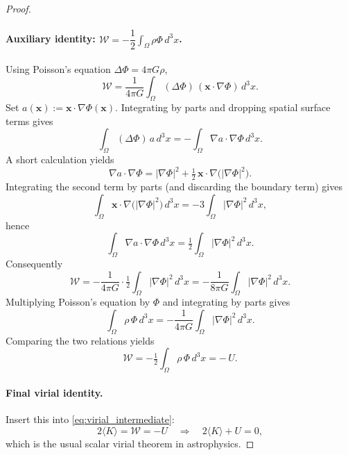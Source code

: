 \documentclass[10pt,a4paper]{amsart}
\begin{document}
\begin{proof}
\paragraph{Auxiliary identity: \(\mathcal{W} = -\dfrac{1}{2}\!\displaystyle\int_{\Omega}\rho\Phi\,d^3x\).}
Using Poisson's equation \(\Delta\Phi=4\pi G\rho\),
\begin{equation}
\mathcal{W} = \frac{1}{4\pi G}\int_{\Omega} (\Delta\Phi)\,(\mathbf{x}\!\cdot\!\nabla\Phi)\,d^3x.
\end{equation}
Set $a(\mathbf{x}):=\mathbf{x}\!\cdot\!\nabla\Phi(\mathbf{x})$. Integrating by parts and dropping spatial surface terms gives
\begin{equation}
\int_{\Omega} (\Delta\Phi)\,a\,d^3x = -\int_{\Omega} \nabla a\!\cdot\!\nabla\Phi\,d^3x.
\end{equation}
A short calculation yields
\begin{equation}
\nabla a\!\cdot\!\nabla\Phi = |\nabla\Phi|^2 + \tfrac12\,\mathbf{x}\!\cdot\!\nabla\big(|\nabla\Phi|^2\big).
\end{equation}
Integrating the second term by parts (and discarding the boundary term) gives
\begin{equation}
\int_{\Omega} \mathbf{x}\!\cdot\!\nabla\big(|\nabla\Phi|^2\big)\,d^3x = -3\int_{\Omega} |\nabla\Phi|^2\,d^3x,
\end{equation}
hence
\begin{equation}
\int_{\Omega} \nabla a\!\cdot\!\nabla\Phi\,d^3x = \tfrac12\int_{\Omega} |\nabla\Phi|^2\,d^3x.
\end{equation}
Consequently
\begin{equation}
\mathcal{W} = -\frac{1}{4\pi G}\cdot \tfrac12\int_{\Omega} |\nabla\Phi|^2\,d^3x
= -\frac{1}{8\pi G}\int_{\Omega} |\nabla\Phi|^2\,d^3x.
\end{equation}
Multiplying Poisson's equation by \(\Phi\) and integrating by parts gives
\begin{equation}
\int_{\Omega} \rho\,\Phi\,d^3x = -\frac{1}{4\pi G}\int_{\Omega} |\nabla\Phi|^2\,d^3x.
\end{equation}
Comparing the two relations yields
\begin{equation}
\mathcal{W} = -\tfrac12 \int_{\Omega} \rho\,\Phi\,d^3x = -\,U.
\end{equation}

\paragraph{Final virial identity.}
Insert this into \eqref{eq:virial_intermediate}:
\begin{equation}
2\langle {K}\rangle = \mathcal{W} = -U \quad\Longrightarrow\quad 2\langle {K}\rangle + U = 0,
\end{equation}
which is the usual scalar virial theorem in astrophysics.
\end{proof}
\end{document}
